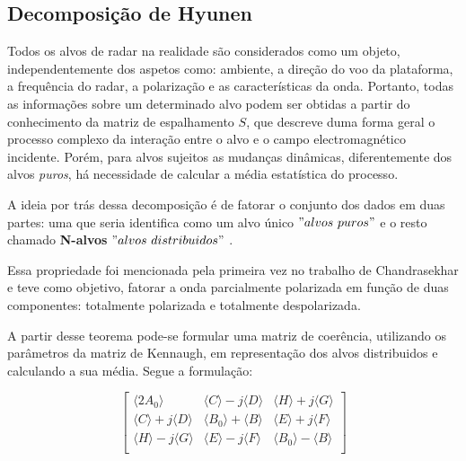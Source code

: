 \documentclass{article}
\begin{document}
\subsection{\textbf{Decomposição de Hyunen}}

Todos os alvos de radar na realidade são considerados como um objeto,  independentemente dos aspetos como: ambiente, a direção do voo da plataforma, a frequência do radar, a polarização e as características da onda. Portanto, todas as informações sobre um determinado alvo podem ser obtidas a partir do conhecimento da matriz de espalhamento $S$, que descreve duma forma geral o processo complexo da interação entre o alvo e o campo electromagnético incidente. Porém, para alvos sujeitos as mudanças dinâmicas, diferentemente dos alvos \textit{puros}, há necessidade de calcular a média estatística do processo. 

A ideia por trás dessa decomposição é de fatorar o conjunto dos dados em duas partes: uma que seria identifica como um alvo único $"alvos \ puros"$ e o resto chamado \textbf{N-alvos} $"alvos \ distribuidos"$ \cite{jong:2009}. 

Essa propriedade foi mencionada pela primeira vez no trabalho de Chandrasekhar e teve como objetivo, fatorar a onda parcialmente polarizada em função de duas componentes:
totalmente polarizada e totalmente despolarizada.

A partir desse teorema pode-se formular uma matriz de coerência, utilizando os parâmetros da matriz de Kennaugh, em representação dos alvos distribuidos e calculando a sua média. Segue a formulação:

\begin{equation}
    \begin{bmatrix}
        \langle2A_{0}\rangle & \langle C \rangle-j\langle D \rangle & \langle H \rangle+j\langle G \rangle\\
        \langle C \rangle+j\langle D \rangle & \langle B_{0} \rangle+\langle B \rangle & \langle E \rangle+j\langle F \rangle\\
        \langle H \rangle-j\langle G \rangle & \langle E \rangle-j\langle F \rangle & \langle B_{0} \rangle-\langle B \rangle\\
    \end{bmatrix}
\end{equation}
\end{document}
